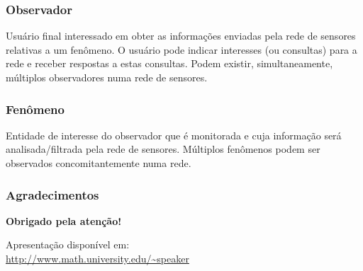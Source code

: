 \documentclass[notes]{beamer}
\begin{document}
\begin{frame}

\frametitle{Observador}

Usuário final interessado em obter
as informações enviadas pela rede de sensores relativas a um fenômeno. O usuário pode indicar interesses (ou consultas) para a rede e receber respostas a estas
consultas. Podem existir, simultaneamente,
múltiplos observadores numa rede de sensores.

\end{frame}

\begin{frame}

\frametitle{Fenômeno}

Entidade de interesse do observador que é monitorada e cuja
informação será analisada/filtrada pela rede de sensores. Múltiplos fenômenos
podem ser observados concomitantemente numa rede.

\end{frame}

\begin{frame}
\frametitle{Agradecimentos}
\vskip20pt

\begin{center}
{\bf \color{alert} Obrigado pela atenção!}
\end{center}

\vskip20pt

\begin{center}
Apresentação disponível em:\\
\url{http://www.math.university.edu/~speaker}
\vskip12pt
\end{center}

\titlepage
\end{frame}
\end{document}
